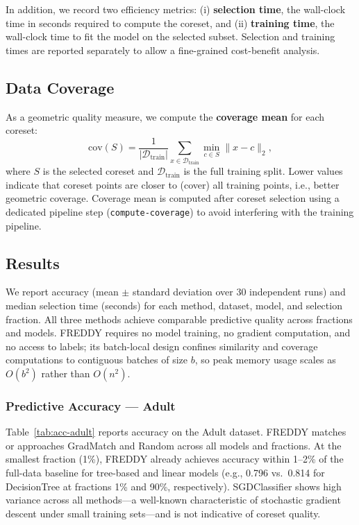 \documentclass{article}
\begin{document}
In addition, we record two efficiency metrics: (i) \textbf{selection time},
the wall-clock time in seconds required to compute the coreset, and (ii)
\textbf{training time}, the wall-clock time to fit the model on the selected
subset.
Selection and training times are reported separately to allow a
fine-grained cost-benefit analysis.

\subsection{Data Coverage}

As a geometric quality measure, we compute the \textbf{coverage mean}
for each coreset:
\[
  \text{cov}(S) = \frac{1}{|\mathcal{D}_\text{train}|}
    \sum_{x \in \mathcal{D}_\text{train}}
    \min_{c \in S} \|x - c\|_2,
\]
where $S$ is the selected coreset and $\mathcal{D}_\text{train}$ is
the full training split.
Lower values indicate that coreset points are closer to (cover) all
training points, i.e., better geometric coverage.
Coverage mean is computed after coreset selection using a dedicated
pipeline step (\texttt{compute-coverage}) to avoid interfering with
the training pipeline.



\subsection{Results}
\label{sec:results}

We report accuracy (mean $\pm$ standard deviation over 30 independent runs) and median selection time (seconds) for each method, dataset, model, and selection fraction.
All three methods achieve comparable predictive quality across fractions and models.
FREDDY requires no model training, no gradient computation, and no access to labels; its batch-local design confines similarity and coverage computations to contiguous batches of size $b$, so peak memory usage scales as $O(b^2)$ rather than $O(n^2)$.

\subsubsection*{Predictive Accuracy --- Adult}

Table~\ref{tab:acc-adult} reports accuracy on the Adult dataset.
FREDDY matches or approaches GradMatch and Random across all models and fractions.
At the smallest fraction (1\%), FREDDY already achieves accuracy within 1--2\% of the full-data baseline for tree-based and linear models (e.g., 0.796 vs.\ 0.814 for DecisionTree at fractions 1\% and 90\%, respectively).
SGDClassifier shows high variance across all methods---a well-known characteristic of stochastic gradient descent under small training sets---and is not indicative of coreset quality.
\end{document}
